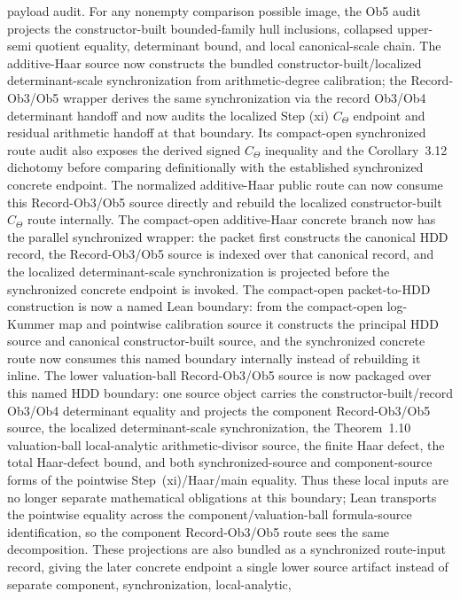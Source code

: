 \documentclass[11pt]{article}
\theoremstyle{plain}
\theoremstyle{definition}
\theoremstyle{remark}
\begin{document}
payload audit.  For any nonempty comparison possible image, the Ob5 audit
projects the constructor-built
bounded-family hull inclusions, collapsed upper-semi quotient equality,
determinant bound, and local canonical-scale chain.
The additive-Haar source now constructs the bundled constructor-built/localized
determinant-scale synchronization from arithmetic-degree calibration; the
Record-Ob3/Ob5 wrapper derives the same synchronization via the record Ob3/Ob4
determinant handoff and now audits the localized Step (xi) \(C_\Theta\)
endpoint and residual arithmetic handoff at that boundary.  Its compact-open
synchronized route audit also exposes the derived signed \(C_\Theta\)
inequality and the Corollary~3.12 dichotomy before comparing definitionally
with the established synchronized concrete endpoint.  The normalized
additive-Haar public route can now consume this Record-Ob3/Ob5 source directly
and rebuild the localized constructor-built \(C_\Theta\) route internally.  The
compact-open additive-Haar concrete branch now has the parallel synchronized
wrapper: the packet first constructs the canonical HDD record, the
Record-Ob3/Ob5 source is indexed over that canonical record, and the localized
determinant-scale synchronization is projected before the synchronized
concrete endpoint is invoked.  The compact-open packet-to-HDD construction is
now a named Lean boundary: from the compact-open log-Kummer map and pointwise
calibration source it constructs the principal HDD source and canonical
constructor-built source, and the synchronized concrete route now consumes this
named boundary internally instead of rebuilding it inline.  The lower
valuation-ball Record-Ob3/Ob5 source is now packaged over this named HDD
boundary: one source object carries the constructor-built/record Ob3/Ob4
determinant equality and projects the component Record-Ob3/Ob5 source, the
localized determinant-scale synchronization, the Theorem~1.10 valuation-ball
local-analytic arithmetic-divisor source, the finite Haar defect, the total
Haar-defect bound, and both synchronized-source and component-source forms of
the pointwise Step~(xi)/Haar/main equality.  Thus these local inputs are no
longer separate mathematical obligations at this boundary; Lean transports the
pointwise equality across the component/valuation-ball formula-source
identification, so the component Record-Ob3/Ob5 route sees the same
decomposition.  These projections are also bundled as a synchronized
route-input record, giving the later concrete endpoint a single lower source
artifact instead of separate component, synchronization, local-analytic,
\end{document}
